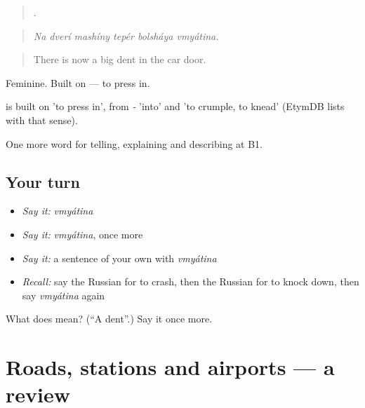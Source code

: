 \begin{quote}
     .
\end{quote}

\begin{quote}
\emph{Na dverí mashíny tepér bolsháya vmyátina.}
\end{quote}

\begin{quote}
There is now a big dent in the car door.
\end{quote}

Feminine. Built on \emph{} — to press in.

\begin{cousinweb}
\emph{} is built on \emph{} 'to press in', from \emph{-} 'into' and \emph{} 'to crumple, to knead' (EtymDB lists \emph{} with that sense).
\end{cousinweb}

\begin{grammarlens}[title={What you've built}]
One more word for telling, explaining and describing at B1.
\end{grammarlens}

\subsection*{Your turn}
\begin{itemize}
\raggedright
  \item \emph{Say it:} \emph{vmyátina}
  \item \emph{Say it:} \emph{vmyátina}, once more
  \item \emph{Say it:} a sentence of your own with \emph{vmyátina}
  \item \emph{Recall:} say the Russian for to crash, then the Russian for to knock down, then say \emph{vmyátina} again
\end{itemize}

\begin{tcolorbox}[breakable,colback=teal!4,colframe=teal!35!black,title={Before you move on}]
What does  mean? (\textquotedblleft{}A dent\textquotedblright{}.) Say it once more.
\end{tcolorbox}
\section[(dialogue)]{Roads, stations and airports — a review}


